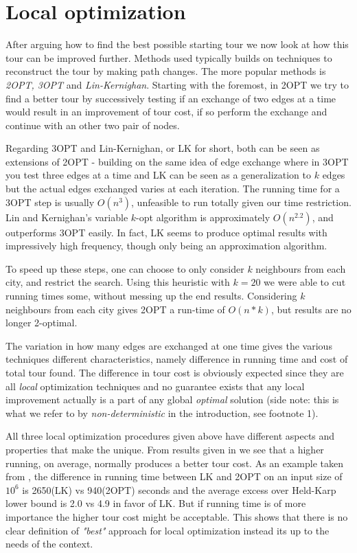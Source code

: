 \documentclass[a4paper,12pt,oneside]{article}
\begin{document}
\section{Local optimization}

After arguing how to find the best possible starting tour we now look at how this tour can be improved further. Methods used typically builds on techniques to reconstruct the tour by making path changes. The more popular methods is \textit{2OPT, 3OPT} and \textit{Lin-Kernighan}. Starting with the foremost, in 2OPT we try to find a better tour by successively testing if an exchange of two edges at a time would result in an improvement of tour cost, if so perform the exchange and continue with an other two pair of nodes.

Regarding 3OPT and Lin-Kernighan, or LK for short, both can be seen as extensions of 2OPT - building on the same idea of edge exchange where in 3OPT you test three edges at a time and LK can be seen as a generalization to $k$ edges but the actual edges exchanged varies at each iteration. The running time for a 3OPT step is usually $O(n^3)$, unfeasible to run totally given our time restriction. Lin and Kernighan's variable $k$-opt algorithm is approximately $O(n^{2.2})$, and outperforms 3OPT easily\cite{lk}. In fact, LK seems to produce optimal results with impressively high frequency, though only being an approximation algorithm.

To speed up these steps, one can choose to only consider $k$ neighbours from each city, and restrict the search. Using this heuristic with $k=20$ we were able to cut running times some, without messing up the end results. Considering $k$ neighbours from each city gives 2OPT a run-time of $O(n*k)$, but results are no longer 2-optimal.

The variation in how many edges are exchanged at one time gives the various techniques different characteristics, namely difference in running time and cost of total tour found. The difference in tour cost is obviously expected since they are all \textit{local} optimization techniques and no guarantee exists that any local improvement actually is a part of any global \textit{optimal} solution (side note: this is what we refer to by \textit{non-deterministic} in the introduction, see footnote 1).

All three local optimization procedures given above have different aspects and properties that make the unique. From results given in \cite{localopt} we see that a higher running, on average, normally produces a better tour cost. As an example taken from \cite{localopt}, the difference in running time between LK and 2OPT on an input size of $10^6$ is 2650(LK) vs 940(2OPT) seconds and the average excess over Held-Karp lower bound is 2.0 vs 4.9 in favor of LK. But if running time is of more importance the higher tour cost might be acceptable. This shows that there is no clear definition of \textit{"best"} approach for local optimization instead its up to the needs of the context. 
\end{document}
